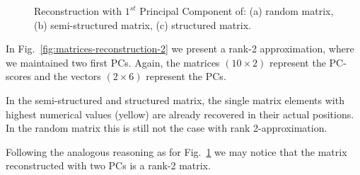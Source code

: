 \documentclass[10pt,twocolumn]{article}
\begin{document}
\begin{figure}[H]
\begin{subfigure}[t]{.15\textwidth}
\caption{ }
\end{subfigure}
\caption{Reconstruction with $1^{st}$ Principal Component of: (a) random matrix, (b) semi-structured matrix, (c) structured matrix.}
\label{fig:matrices-reconstruction-1}
\end{figure}

In Fig.~\ref{fig:matrices-reconstruction-2} we present a rank-2 approximation, where we maintained two first PCs. Again, the matrices $(10 \times 2)$ represent the PC-scores and the vectors $(2 \times 6)$ represent the PCs.

In the semi-structured and structured matrix, the single matrix elements with highest numerical values (yellow) are already recovered in their actual positions. In the random matrix this is still not the case with rank 2-approximation.

Following the analogous reasoning as for Fig.~\ref{fig:matrices-reconstruction-1} we may notice that the matrix reconstructed with two PCs is a rank-2 matrix.
\end{document}
